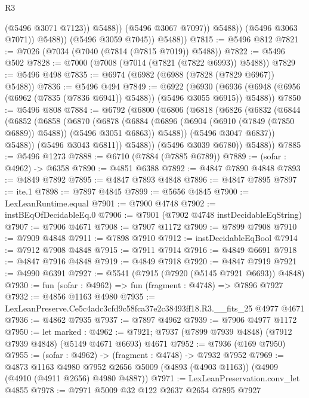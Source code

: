 \begin{lexlean}{R3}
\begin{coremodule}
                            (@5496 @3071 @7123))
                          @5488))
                      (@5496 @3067 @7097))
                    @5488))
                (@5496 @3063 @7071))
              @5488))
          (@5496 @3059 @7045))
        @5488))
@7815 := @5496 @812
@7821 := @7026 (@7034 (@7040 (@7814 (@7815 @7019)) @5488))
@7822 := @5496 @502
@7828 := @7000 (@7008 (@7014 (@7821 (@7822 @6993)) @5488))
@7829 := @5496 @498
@7835 := @6974 (@6982 (@6988 (@7828 (@7829 @6967)) @5488))
@7836 := @5496 @494
@7849 := @6922
    (@6930 (@6936 (@6948 (@6956 (@6962 (@7835 (@7836 @6941)) @5488)) (@5496 @3055 @6915)) @5488))
@7850 := @5496 @808
@7884 := @6792
    (@6800
      (@6806
        (@6818
          (@6826
            (@6832
              (@6844
                (@6852
                  (@6858
                    (@6870
                      (@6878
                        (@6884
                          (@6896 (@6904 (@6910 (@7849 (@7850 @6889)) @5488)) (@5496 @3051 @6863))
                          @5488))
                      (@5496 @3047 @6837))
                    @5488))
                (@5496 @3043 @6811))
              @5488))
          (@5496 @3039 @6780))
        @5488))
@7885 := @5496 @1273
@7888 := @6710 (@7884 (@7885 @6789))
@7889 := (sofar : @4962) -> @6358
@7890 := @4851 @6388
@7892 := @4847 @7890 @4848
@7893 := @4849 @7892
@7895 := @4847 @7893 @4848
@7896 := @4847 @7895
@7897 := ite.{1}
@7898 := @7897 @4845
@7899 := @5656 @4845
@7900 := LexLeanRuntime.equal
@7901 := @7900 @4748
@7902 := instBEqOfDecidableEq.{0}
@7906 := @7901 (@7902 @4748 instDecidableEqString)
@7907 := @7906 @4671
@7908 := @7907 @1172
@7909 := @7899 @7908
@7910 := @7909 @4848
@7911 := @7898 @7910
@7912 := instDecidableEqBool
@7914 := @7912 @7908 @4848
@7915 := @7911 @7914
@7916 := @4849 @6691
@7918 := @4847 @7916 @4848
@7919 := @4849 @7918
@7920 := @4847 @7919
@7921 := @4990 @6391
@7927 := @5541 (@7915 (@7920 (@5145 @7921 @6693)) @4848)
@7930 := fun (sofar : @4962) => fun (fragment : @4748) => @7896 @7927
@7932 := @4856 @1163 @4980
@7935 := LexLeanPreserve.Ce5c4adc3cfd9c58fca37e2c38493ff18.R3.__fits_25 @4977 @4671
@7936 := @4862 @7935
@7937 := @7897 @4962
@7939 := @7906 @4977 @1172
@7950 := let marked : @4962 := @7921;
  @7937 (@7899 @7939 @4848) (@7912 @7939 @4848) (@5149 @4671 @6693) @4671
@7952 := @7936 (@169 @7950)
@7955 := (sofar : @4962) -> (fragment : @4748) -> @7932 @7952
@7969 := @4873
    @1163
    @4980
    @7952
    @2656
    @5009
    (@4893 (@4903 @1163))
    (@4909 (@4910 (@4911 @2656) @4980 @4887))
@7971 := LexLeanPreservation.conv_let @4855
@7978 := @7971 @5009 @32 @122 @2637 @2654 @7895 @7927

\end{coremodule}
\end{lexlean}
